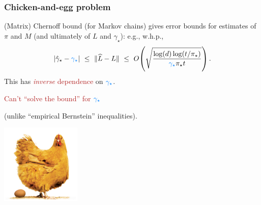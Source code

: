 \documentclass[11pt,compress,blue4,notheorems]{beamer}
\newcommand{\FIREBRICK}[1]{\textcolor{firebrick}{#1}}
\newcommand{\AZURE}[1]{\textcolor{azure}{#1}}
\newcommand\fns\footnotesize
\newcommand\pimin{\ensuremath{\pi_{\star}}}
\newcommand\gap{\ensuremath{\gamma_{\star}}}
\newcommand\hatgap{\ensuremath{\hat{\gamma}_{\star}}}
\begin{document}

\begin{frame}
  \frametitle{Chicken-and-egg problem}

  (Matrix) Chernoff bound {\fns(for Markov chains)} gives error bounds
  for estimates of $\pi$ and $M$ (and ultimately of $L$ and $\gap$):
  e.g., w.h.p.,
  \[
    \abs{\hatgap-\AZURE{\gap}}
    \ \leq \
    \norm{\wh L - L}
    \ \leq \
    O\Parens{
      \sqrt{\frac{\log(d)\log(t/\pimin)}{\AZURE{\gap}\pimin t}}
    }
    \,.
  \]
  \onslide<2->
  This has \FIREBRICK{\emph{inverse} dependence} on $\AZURE{\gap}$.

  \onslide<3->
  \begin{center}
    \FIREBRICK{%
      Can't ``solve the bound'' for $\AZURE{\gap}$
    }

    {\fns(unlike ``empirical Bernstein'' inequalities)}.

    \includegraphics[height=1.5in]{chicken-and-egg.jpg}
  \end{center}

\end{frame}

\end{document}
